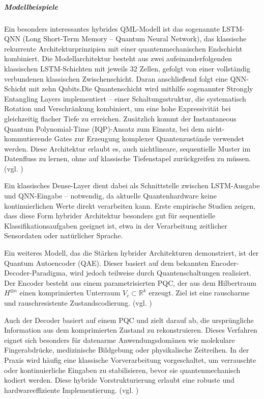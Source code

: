 \subparagraph{Modellbeispiele}
Ein besonders interessantes hybrides QML-Modell ist das sogenannte LSTM-QNN (Long Short-Term Memory – Quantum Neural Network), das klassische rekurrente Architekturprinzipien mit einer quantenmechanischen Endschicht kombiniert. Die Modellarchitektur besteht aus zwei aufeinanderfolgenden klassischen LSTM-Schichten mit jeweils 32 Zellen, gefolgt von einer vollständig verbundenen klassischen Zwischenschicht. Daran anschließend folgt eine QNN-Schicht mit zehn Qubits.Die Quantenschicht wird mithilfe sogenannter Strongly Entangling Layers implementiert – einer Schaltungsstruktur, die systematisch Rotation und Verschränkung kombiniert, um eine hohe Expressivität bei gleichzeitig flacher Tiefe zu erreichen. Zusätzlich kommt der Instantaneous Quantum Polynomial-Time (IQP)-Ansatz zum Einsatz, bei dem nicht-kommutierende Gates zur Erzeugung komplexer Quantenzustände verwendet werden. Diese Architektur erlaubt es, auch nichtlineare, sequentielle Muster im Datenfluss zu lernen, ohne auf klassische Tiefenstapel zurückgreifen zu müssen. (vgl. \cite{peral-garciaSystematicLiteratureReview2024})

Ein klassisches Dense-Layer dient dabei als Schnittstelle zwischen LSTM-Ausgabe und QNN-Eingabe – notwendig, da aktuelle Quantenhardware keine kontinuierlichen Werte direkt verarbeiten kann. Erste empirische Studien zeigen, dass diese Form hybrider Architektur besonders gut für sequentielle Klassifikationsaufgaben geeignet ist, etwa in der Verarbeitung zeitlicher Sensordaten oder natürlicher Sprache.

Ein weiteres Modell, das die Stärken hybrider Architekturen demonstriert, ist der Quantum Autoencoder (QAE). Dieser basiert auf dem bekannten Encoder-Decoder-Paradigma, wird jedoch teilweise durch Quantenschaltungen realisiert. Der Encoder besteht aus einem parametrisierten PQC, der aus dem Hilbertraum $H^{\otimes n}$ einen komprimierten Unterraum $V_c \subset \mathbb{R}^k$ erzeugt. Ziel ist eine rauscharme und rauschresistente Zustandscodierung. (vgl. \cite{peral-garciaSystematicLiteratureReview2024})

Auch der Decoder basiert auf einem PQC und zielt darauf ab, die ursprüngliche Information aus dem komprimierten Zustand zu rekonstruieren. Dieses Verfahren eignet sich besonders für datenarme Anwendungsdomänen wie molekulare Fingerabdrücke, medizinische Bildgebung oder physikalische Zeitreihen. In der Praxis wird häufig eine klassische Vorverarbeitung vorgeschaltet, um verrauschte oder kontinuierliche Eingaben zu stabilisieren, bevor sie quantenmechanisch kodiert werden. Diese hybride Vorstrukturierung erlaubt eine robuste und hardwareeffiziente Implementierung. (vgl. \cite{peral-garciaSystematicLiteratureReview2024})

